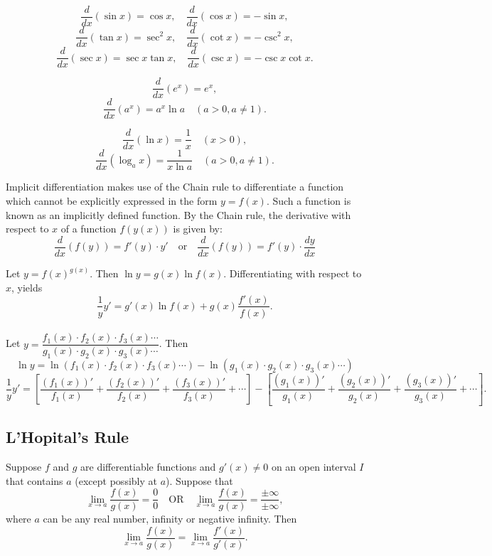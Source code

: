 \documentclass{article}
\newcommand{\theorem}[2]{\begin{tcolorbox}[title={#1},colback=blue!5!white,colframe=blue!75!black,parbox=false] #2 \end{tcolorbox}}
\begin{document}
\theorem{Trigonometric Derivatives}{
$$
\frac{d}{dx}(\sin x) = \cos x, \quad
\frac{d}{dx}(\cos x) = -\sin x,
$$
$$
\frac{d}{dx}(\tan x) = \sec^2 x, \quad
\frac{d}{dx}(\cot x) = -\csc^2 x,
$$
$$
\frac{d}{dx}(\sec x) = \sec x \tan x, \quad
\frac{d}{dx}(\csc x) = -\csc x \cot x.
$$
}

\theorem{Exponential Derivatives}{
$$
\frac{d}{dx}(e^x) = e^x,
$$
$$
\frac{d}{dx}(a^x) = a^x \ln a \quad (a > 0, a \neq 1).
$$
}

\theorem{Logarithmic Derivatives}{
$$
\frac{d}{dx}(\ln x) = \frac{1}{x} \quad (x > 0),
$$
$$
\frac{d}{dx}(\log_a x) = \frac{1}{x \ln a} \quad (a > 0, a \neq 1).
$$
}

\theorem{ Implicit Differentiation } {
    Implicit differentiation makes use of the Chain rule to differentiate a function which cannot be explicitly expressed in the form $y = f(x)$. Such a function is known as an implicitly defined function. By the Chain rule, the derivative with respect to $x$ of a function $f(y(x))$ is given by:
    $$\frac{d}{dx}(f(y)) = f'(y) \cdot y' \quad \text{or} \quad \frac{d}{dx}(f(y)) = f'(y) \cdot \frac{dy}{dx}$$
}

\theorem{Logarithmic Differentiation}{
Let $y = f(x)^{g(x)}$. Then $\ln y = g(x) \ln f(x)$. Differentiating with respect to $x$, yields\\
\[
\frac{1}{y} y' = g'(x)\ln f(x) + g(x)\frac{f'(x)}{f(x)}.
\]\\
Let $y = \dfrac{f_1(x)\cdot f_2(x)\cdot f_3(x)\cdots}{g_1(x)\cdot g_2(x)\cdot g_3(x)\cdots}$. Then\\
\[
\ln y = \ln(f_1(x)\cdot f_2(x)\cdot f_3(x)\cdots) - \ln(g_1(x)\cdot g_2(x)\cdot g_3(x)\cdots)
\]
\[
\frac{1}{y}y' =
\left[
\frac{(f_1(x))'}{f_1(x)} +
\frac{(f_2(x))'}{f_2(x)} +
\frac{(f_3(x))'}{f_3(x)} + \cdots
\right]
-
\left[
\frac{(g_1(x))'}{g_1(x)} +
\frac{(g_2(x))'}{g_2(x)} +
\frac{(g_3(x))'}{g_3(x)} + \cdots
\right].
\]
}

\subsection{L'Hopital's Rule}
\theorem{ L'Hôpital's Rule } {Suppose $f$ and $g$ are differentiable functions and $g'(x) \neq 0$ on an open interval $I$ that contains $a$ (except possibly at $a$). Suppose that$$ \lim_{x \to a} \frac{f(x)}{g(x)} = \frac{0}{0} \quad \text{OR} \quad \lim_{x \to a} \frac{f(x)}{g(x)} = \frac{\pm\infty}{\pm\infty}, $$where $a$ can be any real number, infinity or negative infinity. Then$$ \lim_{x \to a} \frac{f(x)}{g(x)} = \lim_{x \to a} \frac{f'(x)}{g'(x)}. $$}
\end{document}
